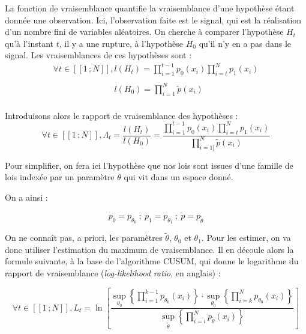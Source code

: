 \documentclass[french,11pt,notitlepage]{report}
\begin{document}
	La fonction de vraisemblance quantifie la vraisemblance d'une hypothèse étant donnée une observation.
	Ici, l'observation faite est le signal, qui est la réalisation d'un nombre fini de variables aléatoires.
	On cherche à comparer l'hypothèse $H_t$ qu'à l'instant $t$, il y a une rupture, à l'hypothèse $H_0$ qu'il n'y en a pas dans le signal.
	Les vraisemblances de ces hypothèses sont :
	\begin{equation}
	\begin{array}{ll}
		\forall t \in [\![1\,; N]\!], l(H_t) = \prod_{i = 1}^{t-1} p_0(x_i) \prod_{i = t}^{N} p_1(x_i) \\\\
		\phantom{\forall t \in [\![1\,; N]\!], }l(H_0) = \prod_{i = 1}^N\tilde p(x_i) \\
	\end{array}	
	\end{equation}
	
	Introduisons alors le rapport de vraisemblance des hypothèses :
	\begin{equation}
		\forall t \in [\![1\,; N]\!], \Lambda_t = \frac{l(H_t)}{l(H_0)} = \frac{\prod_{i = 1}^{t-1} p_0(x_i) \prod_{i = t}^{N} p_1(x_i)}{\prod_{i = 1]}^{N} \tilde p(x_i)}
	\end{equation}
	
	Pour simplifier, on fera ici l'hypothèse que nos lois sont issues d'une famille de lois indexée par un paramètre $\theta$ qui vit dans un espace donné.

	On a ainsi :
	
	\begin{equation*}
		p_0 = p_{\theta_0}~;~p_1 = p_{\theta_1}~;~\tilde p = p_{\tilde\theta}
	\end{equation*}
	
	On ne connaît pas, a priori, les paramètres $\tilde\theta$, $\theta_0$ et $\theta_1$.
	Pour les estimer, on va donc utiliser l'estimation du maximum de vraisemblance.
	Il en découle alors la formule suivante, à la base de l'algorithme CUSUM, qui donne le logarithme du rapport de vraisemblance (\textit{log-likelihood ratio}, en anglais) :
	
	\begin{equation}
		\forall t \in [\![1\,; N]\!], L_t=\ln \left[ \frac{\sup_{\theta_0}\left\{ \prod_{i=1}^{k-1} p_{\theta_0}(x_i) \right\} \cdot \sup_{\theta_0} \left\{ \prod_{i = k}^{N}p_{\theta_0}(x_i) \right\}}{\sup_{\tilde\theta}\left\{\prod_{i=i}^{N}p_{\tilde{\theta}}(x_i)\right\}} \right]
		\label{log_likelihood_ratio}
	\end{equation}
	
\end{document}
